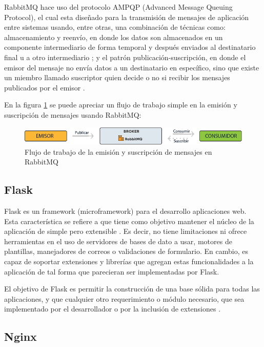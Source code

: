 RabbitMQ hace uso del protocolo AMPQP (Advanced Message Queuing Protocol), el cual esta diseñado para la transmisión
de mensajes de aplicación entre sistemas usando, entre otras, una combinación de técnicas como: almacenamiento y reenvío, en donde
los datos son almacenados en un componente intermediario de forma temporal y después enviados al destinatario final u a otro
intermediario \cite{15}; y el patrón publicación-suscripción, en donde el emisor del mensaje no envía datos a un destinatario
en específico, sino que existe un miembro llamado suscriptor quien decide o no si recibir los mensajes publicados por el emisor \cite{16}.

En la figura \ref{fig:workflow_rabbitmq} se puede apreciar un flujo de trabajo simple en la emisión y suscripción de mensajes usando RabbitMQ:

\begin{figure}[H]
	\centering
		\includegraphics[width=1\textwidth]{figures/workflow_rabbitmq}
	\caption{Flujo de trabajo de la emisión y suscripción de mensajes en RabbitMQ}
	\label{fig:workflow_rabbitmq}
\end{figure}

\subsection{Flask}

Flask es un framework (microframework) para el desarrollo aplicaciones
web. Esta característica se refiere a que tiene como objetivo mantener
el núcleo de la aplicación de simple pero extensible \cite{19}.
Es decir, no tiene limitaciones ni ofrece herramientas en el uso de servidores de
bases de dato a usar, motores de plantillas, manejadores de correos o validaciones de
formulario.
En cambio, es capaz de soportar extensiones y librerías que agregan
estas funcionalidades a la aplicación de tal forma que parecieran ser implementadas por Flask.

El objetivo de Flask es permitir la construcción de una base sólida para todas las
aplicaciones, y que cualquier otro requerimiento o módulo necesario, que sea
implementado por el desarrollador o por la inclusión de extensiones \cite{20}.

\subsection{Nginx}

